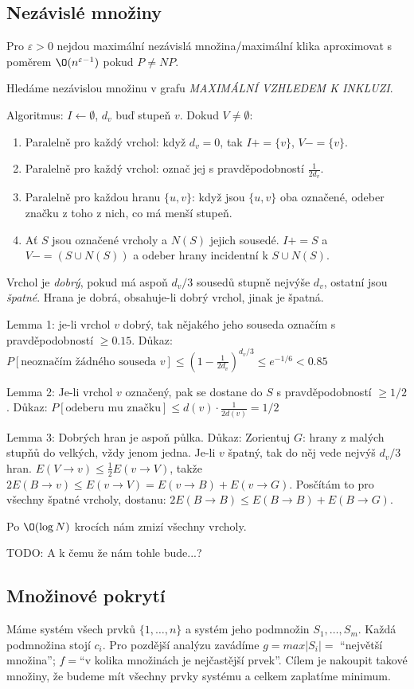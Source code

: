 \documentclass[a4paper,10pt,titlepage]{article} \usepackage[utf8]{inputenc}
\def\imp{\rightarrow}
\begin{document}
\subsection{Nezávislé množiny}
Pro $\varepsilon>0$ nejdou maximální nezávislá množina/maximální klika
aproximovat s poměrem $\O(n^{\varepsilon-1})$ pokud $P\neq NP$.

Hledáme nezávislou množinu v grafu \emph{MAXIMÁLNÍ VZHLEDEM K INKLUZI}.

Algoritmus: $I\gets\emptyset$, $d_v$ buď stupeň $v$. Dokud $V\neq\emptyset$:
\begin{enumerate}
\item Paralelně pro každý vrchol: když $d_v=0$, tak $I+=\{v\}$, $V-=\{v\}$.
\item Paralelně pro každý vrchol: označ jej s pravděpodobností $\frac{1}{2d_v}$.
\item Paralelně pro každou hranu $\{u,v\}$: když jsou $\{u,v\}$ oba označené,
	odeber značku z toho z nich, co má menší stupeň.
\item Ať $S$ jsou označené vrcholy a $N(S)$ jejich sousedé. $I+=S$ a $V-=(S\cup
	N(S))$ a odeber hrany incidentní k $S\cup N(S)$.
\end{enumerate}

Vrchol je \emph{dobrý}, pokud má aspoň $d_v/3$ sousedů stupně nejvýše $d_v$,
ostatní jsou \emph{špatné}. Hrana je dobrá, obsahuje-li dobrý vrchol, jinak je
špatná.

Lemma 1: je-li vrchol $v$ dobrý, tak nějakého jeho souseda označím s
pravděpodobností $\geq 0.15$.
Důkaz: $P[\text{neoznačím žádného souseda }v]\leq (1-\frac{1}{2d_v})^{d_v/3}\leq
	e^{-1/6}<0.85$

Lemma 2: Je-li vrchol $v$ označený, pak se dostane do $S$ s pravděpodobností
	$\geq 1/2$.
Důkaz: $P[\text{odeberu mu značku}]\leq d(v)\cdot\frac{1}{2d(v)}=1/2$

Lemma 3: Dobrých hran je aspoň půlka.
Důkaz: Zorientuj $G$: hrany z malých stupňů do velkých, vždy jenom jedna.
	Je-li $v$ špatný, tak do něj vede nejvýš $d_v/3$ hran.
	$E(V\imp v)\leq\frac{1}{2}E(v\imp V)$,
	takže $2E(B\imp v)\leq E(v\imp V)=E(v\imp B)+E(v\imp G)$.
	Posčítám to pro všechny špatné vrcholy, dostanu:
	$2E(B\imp B)\leq E(B\imp B)+E(B\imp G)$.

Po $\O(\log N)$ krocích nám zmizí všechny vrcholy.

TODO: A k čemu že nám tohle bude...?

\subsection{Množinové pokrytí}
Máme systém všech prvků $\{1, \ldots, n\}$ a systém jeho podmnožin $S_1, \ldots,
S_m$. Každá podmnožina stojí $c_i$. Pro pozdější analýzu zavádíme $g=max|S_i|=$
``největší množina''; $f=$``v kolika množinách je nejčastější prvek''. Cílem je
nakoupit takové množiny, že budeme mít všechny prvky systému a celkem zaplatíme
minimum.
\end{document}

